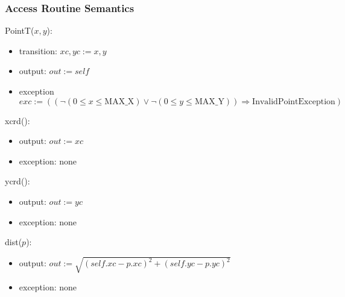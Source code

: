 \documentclass[12pt]{article}
\begin{document}
\subsubsection* {Access Routine Semantics}

PointT($x, y$):
\begin{itemize}
\item transition: $xc, yc := x, y$
\item output: $out := \mathit{self}$
\item exception
 $exc := ((\neg(0 \leq x \leq \mbox{MAX\_X}) \vee \neg(0 \leq y \leq \mbox{MAX\_Y})) \Rightarrow
\mbox{InvalidPointException})$
\end{itemize}

\noindent xcrd():
\begin{itemize}
\item output: $out := xc$
\item exception: none
\end{itemize}

\noindent ycrd():
\begin{itemize}
\item output: $out := yc$
\item exception: none
\end{itemize}

\noindent dist($p$):
\begin{itemize}
\item output: $out := \sqrt{(\mathit{self}.xc - p.xc)^2 + (\mathit{self}.yc - p.yc)^2}$
\item exception: none
\end{itemize}

\newpage
 
\end{document}
